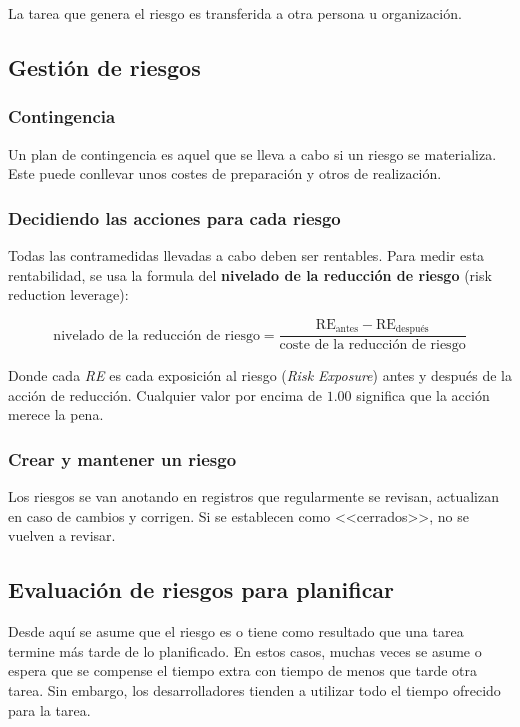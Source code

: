 \documentclass[12pt]{article}
\begin{document}
{La tarea que genera el riesgo es transferida a otra persona u organización.}

\subsection{Gestión de riesgos}
\label{7.8.0}

\subsubsection{Contingencia}
\label{7.8.1}

{Un plan de contingencia es aquel que se lleva a cabo si un riesgo se materializa. Este puede conllevar unos costes de preparación y otros de realización.}

\subsubsection{Decidiendo las acciones para cada riesgo}
\label{7.8.2}

{Todas las contramedidas llevadas a cabo deben ser rentables. Para medir esta rentabilidad, se usa la formula del \textbf{nivelado de la reducción de riesgo} (risk reduction leverage):}

\begin{equation}
    \text{nivelado de la reducción de riesgo} = \frac{\text{RE}_\text{antes} - \text{RE}_\text{después}}{\text{coste de la reducción de riesgo}}
\end{equation}

{Donde cada \textit{RE} es cada exposición al riesgo (\textit{Risk Exposure}) antes y después de la acción de reducción. Cualquier valor por encima de $1.00$ significa que la acción merece la pena.}

\subsubsection{Crear y mantener un riesgo}
\label{7.8.3}

{Los riesgos se van anotando en registros que regularmente se revisan, actualizan en caso de cambios y corrigen. Si se establecen como <<cerrados>>, no se vuelven a revisar.}

\subsection{Evaluación de riesgos para planificar}
\label{7.9.0}

{Desde aquí se asume que el riesgo es o tiene como resultado que una tarea termine más tarde de lo planificado. En estos casos, muchas veces se asume o espera que se compense el tiempo extra con tiempo de menos que tarde otra tarea. Sin embargo, los desarrolladores tienden a utilizar todo el tiempo ofrecido para la tarea.}
\end{document}
